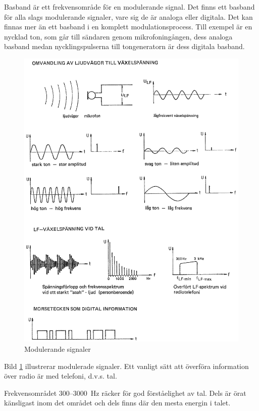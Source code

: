 Basband är ett frekvensområde för en modulerande signal.
Det finns ett basband för alla slags modulerande signaler, vare sig de är
analoga eller digitala.
Det kan finnas mer än ett basband i en komplett modulationsprocess.
Till exempel är en nycklad ton, som går till sändaren genom mikrofoningången,
dess analoga basband medan nycklingspulserna till tongeneratorn är dess
digitala basband.

\begin{figure}
\includegraphics[width=\textwidth]{images/cropped_pdfs/bild_2_1-23.pdf}
\caption{Modulerande signaler}
\label{fig:BildII1-23}
\end{figure}

Bild \ref{fig:BildII1-23} illustrerar modulerade signaler.
Ett vanligt sätt att överföra information över radio är med telefoni, d.v.s.
tal.

Frekvensområdet 300--3000~Hz räcker för god förståelighet av tal.
Dels är örat känsligast inom det området och dels finns där den mesta energin
i talet.

